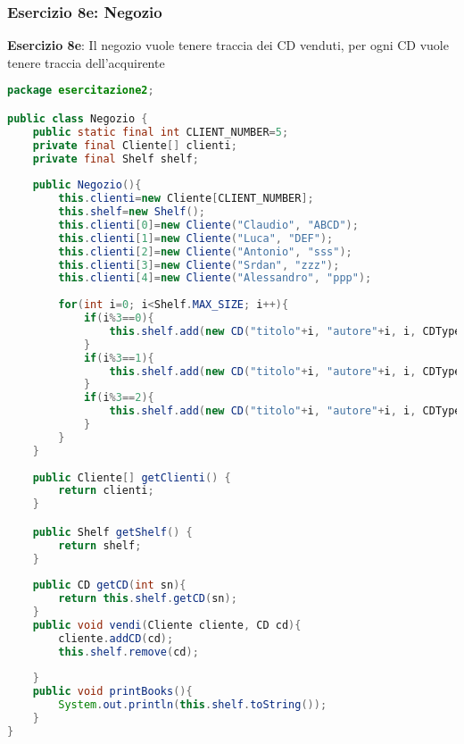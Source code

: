 \documentclass{article}
\begin{document}
\subsubsection{Esercizio 8e: Negozio}
\begin{framed}
\textbf{Esercizio  8e}: Il negozio vuole tenere traccia dei CD venduti, per ogni CD vuole tenere traccia dell'acquirente
\end{framed}
\begin{lstlisting}[language=Java,escapechar=|]
package esercitazione2;

public class Negozio {
	public static final int CLIENT_NUMBER=5;
	private final Cliente[] clienti;
	private final Shelf shelf;
	
	public Negozio(){
		this.clienti=new Cliente[CLIENT_NUMBER];
		this.shelf=new Shelf();
		this.clienti[0]=new Cliente("Claudio", "ABCD");
		this.clienti[1]=new Cliente("Luca", "DEF");
		this.clienti[2]=new Cliente("Antonio", "sss");
		this.clienti[3]=new Cliente("Srdan", "zzz");
		this.clienti[4]=new Cliente("Alessandro", "ppp");
		
		for(int i=0; i<Shelf.MAX_SIZE; i++){
			if(i%3==0){
				this.shelf.add(new CD("titolo"+i, "autore"+i, i, CDType.DANCE));
			}
			if(i%3==1){
				this.shelf.add(new CD("titolo"+i, "autore"+i, i, CDType.COUNTRY));
			}
			if(i%3==2){
				this.shelf.add(new CD("titolo"+i, "autore"+i, i, CDType.DANCE));
			}
		}
	}
	
	public Cliente[] getClienti() {
		return clienti;
	}

	public Shelf getShelf() {
		return shelf;
	}
	
	public CD getCD(int sn){
		return this.shelf.getCD(sn);
	}
	public void vendi(Cliente cliente, CD cd){
		cliente.addCD(cd);
		this.shelf.remove(cd);
		
	}
	public void printBooks(){
		System.out.println(this.shelf.toString());
	}
}

\end{lstlisting}
\end{document}
